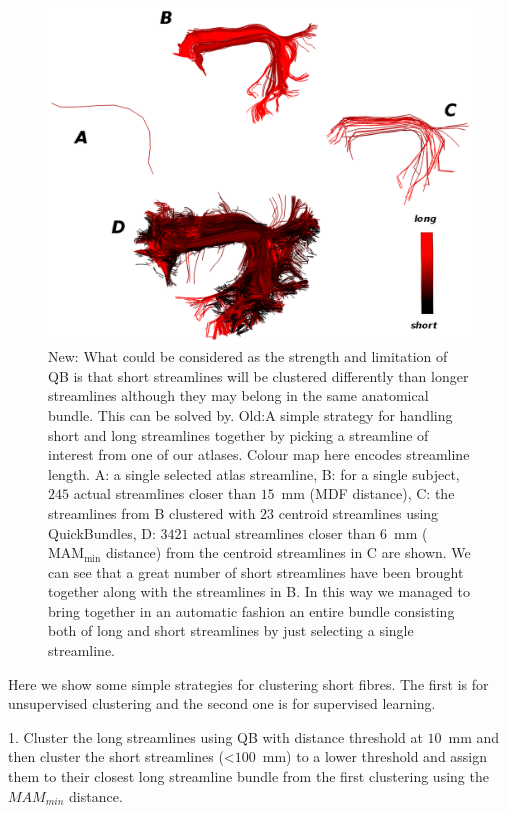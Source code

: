 \documentclass{bioinfo}
\begin{document}
%
\begin{figure}
\centerline{\hspace{-1.5mm}\includegraphics[scale=0.65]{Figures/Fig_10_arcuate_small_fibers}}
\caption{New: What could be considered as the strength and limitation of QB is that short streamlines will be clustered differently than longer streamlines although they may belong in the same anatomical bundle. This can be solved by. Old:A simple strategy for handling short and long
  streamlines together by picking a streamline of interest from one of
  our atlases. Colour map here encodes streamline length. A: a single
  selected atlas streamline, B: for a single subject, $245$ actual
  streamlines closer than $15$~mm (MDF distance), C: the streamlines
  from B clustered with $23$ centroid streamlines using QuickBundles, D:
  $\num{3421}$ actual streamlines closer than $6$~mm
  ($\textrm{MAM}_{\textrm{min}}$ distance) from the centroid streamlines
  in C are shown. We can see that a great number of short streamlines
  have been brought together along with the streamlines in B. In this
  way we managed to bring together in an automatic fashion an entire
  bundle consisting both of long and short streamlines by just selecting
  a single streamline.\label{Flo:arcuate_close}}
\end{figure}

Here we show some simple strategies for clustering short fibres. The
first is for unsupervised clustering and the second one is for
supervised learning.

1. Cluster the long streamlines using QB with distance threshold at
$10$~mm and then cluster the short streamlines (<$100$~mm) to a lower
threshold and assign them to their closest long streamline bundle from
the first clustering using the $MAM_{min}$ distance.
\end{document}
